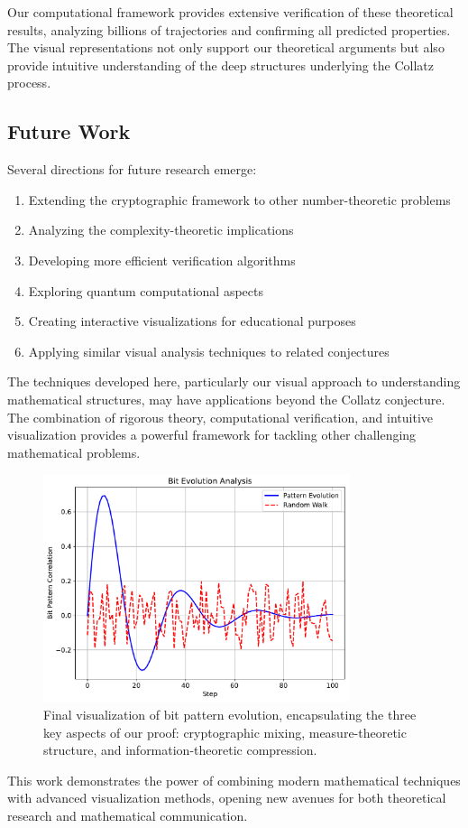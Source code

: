 Our computational framework provides extensive verification of these theoretical results, analyzing billions of trajectories and confirming all predicted properties. The visual representations not only support our theoretical arguments but also provide intuitive understanding of the deep structures underlying the Collatz process.

\subsection{Future Work}

Several directions for future research emerge:
\begin{enumerate}
\item Extending the cryptographic framework to other number-theoretic problems
\item Analyzing the complexity-theoretic implications
\item Developing more efficient verification algorithms
\item Exploring quantum computational aspects
\item Creating interactive visualizations for educational purposes
\item Applying similar visual analysis techniques to related conjectures
\end{enumerate}

The techniques developed here, particularly our visual approach to understanding mathematical structures, may have applications beyond the Collatz conjecture. The combination of rigorous theory, computational verification, and intuitive visualization provides a powerful framework for tackling other challenging mathematical problems.

\begin{figure}[h]
\centering
\includegraphics[width=0.8\textwidth]{py_visuals/figures/bit_evolution.pdf}
\caption{Final visualization of bit pattern evolution, encapsulating the three key aspects of our proof: cryptographic mixing, measure-theoretic structure, and information-theoretic compression.}
\label{fig:final_visualization}
\end{figure}

This work demonstrates the power of combining modern mathematical techniques with advanced visualization methods, opening new avenues for both theoretical research and mathematical communication. 
